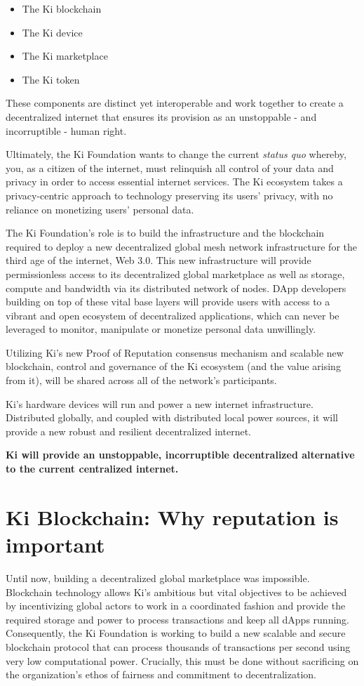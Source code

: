 \begin{itemize}
    \item The Ki blockchain
    \item The Ki device
    \item The Ki marketplace
    \item The Ki token
    \end{itemize}

These components are distinct yet interoperable and work together to create a decentralized internet that ensures its provision as an unstoppable - and incorruptible - human right.

Ultimately, the Ki Foundation wants to change the current \textit{status quo} whereby, you, as a citizen of the internet, must relinquish all control of your data and privacy in order to access essential internet services. The Ki ecosystem takes a privacy-centric approach to technology preserving its users' privacy, with no reliance on monetizing users' personal data.

The Ki Foundation’s role is to build the infrastructure and the blockchain required to deploy a new decentralized global mesh network infrastructure for the third age of the internet, Web 3.0. This new infrastructure will provide permissionless access to its decentralized global marketplace as well as storage, compute and bandwidth via its distributed network of nodes. DApp developers building on top of these vital base layers will provide users with access to a vibrant and open ecosystem of decentralized applications, which can never be leveraged to monitor, manipulate or monetize personal data unwillingly.


Utilizing Ki's new Proof of Reputation consensus mechanism and scalable new blockchain, control and governance of the Ki ecosystem (and the value arising from it), will be shared across all of the network's participants.

Ki's hardware devices will run and power a new internet infrastructure. Distributed globally, and coupled with distributed local power sources, it will provide a new robust and resilient decentralized internet.

\begin{center}
    \textbf{Ki will provide an unstoppable, incorruptible decentralized alternative to the current centralized internet.}
\end{center}

\section{Ki Blockchain: Why reputation is important}
\label{sec:kiblockchain}
Until now, building a decentralized global marketplace was impossible. Blockchain technology allows Ki’s ambitious but vital objectives to be achieved by incentivizing global actors to work in a coordinated fashion and provide the required storage and power to process transactions and keep all dApps running. Consequently, the Ki Foundation is working to build a new scalable and secure blockchain protocol that can process thousands of transactions per second using very low computational power. Crucially, this must be done without sacrificing on the organization's ethos of fairness and commitment to decentralization.


